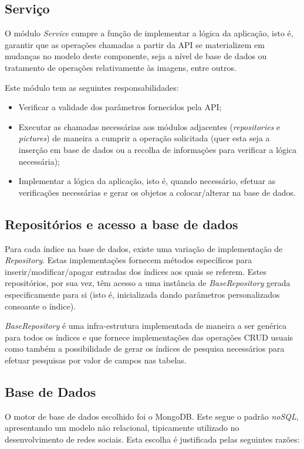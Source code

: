 \newpage

\subsection{Serviço}
O módulo \textit{Service} cumpre a função de implementar a lógica da aplicação, isto é, garantir que as operações chamadas a partir da API se materializem em mudanças no modelo deste componente, seja a nível de base de dados ou tratamento de operações relativamente às imagens, entre outros. \par \medskip

Este módulo tem as seguintes responsabilidades:
\begin{itemize}
	\item Verificar a validade dos parâmetros fornecidos pela API;
	\item Executar as chamadas necessárias aos módulos adjacentes (\textit{repositories} e \textit{pictures}) de maneira a cumprir a operação solicitada (quer esta seja a inserção em base de dados ou a recolha de informações para verificar a lógica necessária);
	\item Implementar a lógica da aplicação, isto é, quando necessário, efetuar as verificações necessárias e gerar os objetos a colocar/alterar na base de dados.
\end{itemize}

\subsection{Repositórios e acesso a base de dados}
Para cada índice na base de dados, existe uma variação de implementação de \textit{Repository}. Estas implementações fornecem métodos específicos para inserir/modificar/apagar entradas dos índices aos quais se referem. Estes repositórios, por sua vez, têm acesso a uma instância de \textit{BaseRepository} gerada especificamente para si (isto é, inicializada dando parâmetros personalizados consoante o índice). \par \medskip

\textit{BaseRepository} é uma infra-estrutura implementada de maneira a ser genérica para todos os índices e que fornece implementações das operações CRUD usuais como também a possibilidade de gerar os índices de pesquisa necessários para efetuar pesquisas por valor de campos nas tabelas. \par \medskip

\subsection{Base de Dados}
O motor de base de dados escolhido foi o MongoDB. Este segue o padrão \textit{noSQL}, apresentando um modelo não relacional, tipicamente utilizado no desenvolvimento de redes sociais. Esta escolha é justificada pelas seguintes razões:

